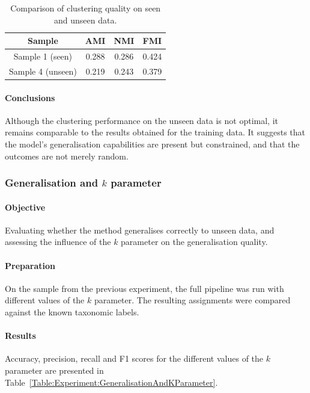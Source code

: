 \documentclass[biomedinformatics,article,submit,moreauthors]{Definitions/mdpi}
\begin{document}
                \begin{table}\centering
                    \caption{Comparison of clustering quality on seen and unseen data.}\label{Table:Experiment:ClusterQuality}

                    \begin{tabular}{|c|c|c|c|}
                        \hline
                        \textbf{Sample} & \textbf{AMI} & \textbf{NMI} & \textbf{FMI} \\ \hline
                        Sample 1 (seen) & 0.288 & 0.286 & 0.424 \\ \hline
                        Sample 4 (unseen) & 0.219 & 0.243 & 0.379 \\ \hline
                    \end{tabular}
                \end{table}

                \paragraph{Conclusions}
                Although the clustering performance on the unseen data is not optimal, it remains comparable to the results obtained for the training data. It suggests that the model's generalisation capabilities are present but constrained, and that the outcomes are not merely random.

            \subsubsection{Generalisation and $k$ parameter}

                \paragraph{Objective}
                Evaluating whether the method generalises correctly to unseen data, and assessing the influence of the $k$ parameter on the generalisation quality.

                \paragraph{Preparation}
                On the sample from the previous experiment, the full pipeline was run with different values of the $k$ parameter. 
                The resulting assignments were compared against the known taxonomic labels.

                \paragraph{Results}
                Accuracy, precision, recall and F1 scores for the different values of the $k$ parameter are presented in Table~\ref{Table:Experiment:GeneralisationAndKParameter}.
                
\end{document}

